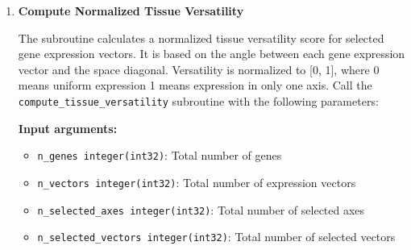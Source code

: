 \begin{enumerate}
\begin{enumerate}
                  \textbf{Output arguments:}
                  \begin{itemize}
                    \item \texttt{is\_outlier logical}: Boolean array with length of
                          \texttt{n\_genes} indicating whether each gene is an outlier
                          
                    \item \texttt{threshold}: Actual threshold value used for outlier
                          detection
                  \end{itemize}
                  \begin{lstlisting}[language=Fortran, caption={Identify Outliers}]
call identify_outliers(n_genes, rdi, sorted_rdi, is_outlier, &
                threshold, percentile)
                  \end{lstlisting}
          \end{enumerate}
                  
    \item \textbf{Compute Normalized Tissue Versatility}
          
          The subroutine calculates a normalized tissue versatility score for selected
          gene expression vectors. It is based on the angle between each gene
          expression vector and the space diagonal. Versatility is normalized to
          [0, 1], where 0 means uniform expression 1 means expression in only one
          axis. Call the \texttt{compute\_tissue\_versatility} subroutine with the
          following parameters:
          
          \textbf{Input arguments:}
          \begin{itemize}
            \item \texttt{n\_genes integer(int32)}: Total number of genes
                  
            \item \texttt{n\_vectors integer(int32)}: Total number of expression
                  vectors
                  
            \item \texttt{n\_selected\_axes integer(int32)}: Total number of selected
                  axes
                  
            \item \texttt{n\_selected\_vectors integer(int32)}: Total number of selected
                  vectors
                  

\end{itemize}
\end{enumerate}
